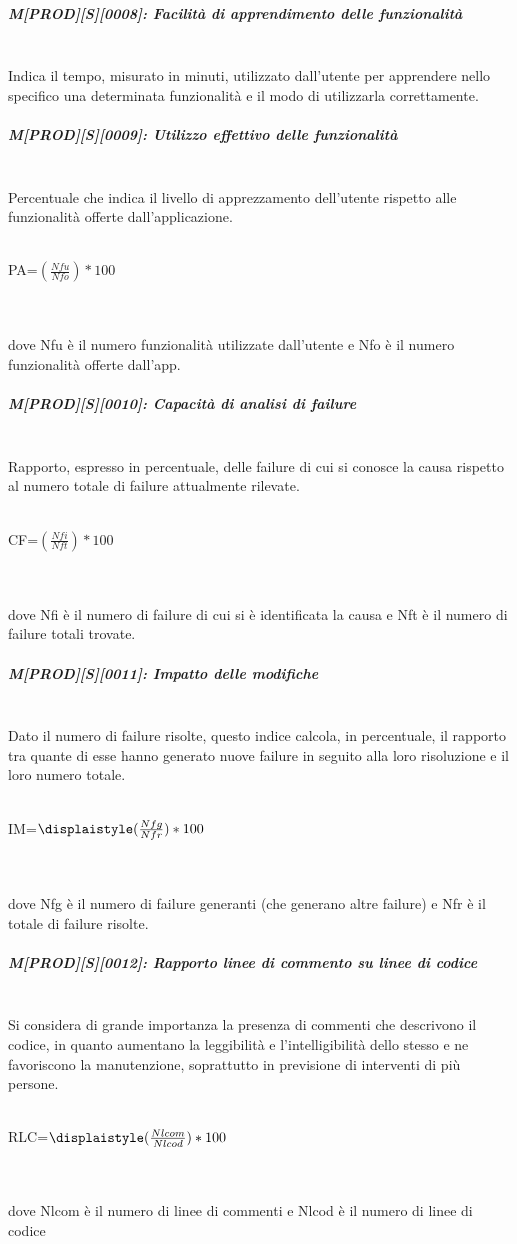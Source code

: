 \subparagraph{M[PROD][S][0008]: Facilità di apprendimento delle funzionalità}
~\\Indica il tempo, misurato in minuti, utilizzato dall'utente per apprendere nello specifico una determinata funzionalità e il modo di utilizzarla correttamente.

\subparagraph{M[PROD][S][0009]: Utilizzo effettivo delle funzionalità}
~\\Percentuale che indica il livello di apprezzamento dell'utente rispetto alle funzionalità offerte dall'applicazione.
     \\\\
    \centerline{PA=${\displaystyle({\frac{Nfu}{Nfo}})*100}$}
    \\\\
dove Nfu è il numero funzionalità utilizzate dall'utente e Nfo è il numero funzionalità offerte dall'app.

\subparagraph{M[PROD][S][0010]: Capacità di analisi di failure}
~\\Rapporto, espresso in percentuale, delle failure di cui si conosce la causa rispetto al numero totale di failure attualmente rilevate.
    \\\\
    \centerline{CF=${\displaystyle({\frac{Nfi}{Nft}})*100}$}
    \\\\
dove Nfi è il numero di failure di cui si è identificata la causa e Nft è il numero di failure totali trovate.

\subparagraph{M[PROD][S][0011]: Impatto delle modifiche}
~\\
Dato il numero di failure risolte, questo indice calcola, in percentuale, il rapporto tra quante di esse hanno generato nuove failure in seguito alla loro risoluzione e il loro numero totale.
    \\\\
    \centerline{IM=${\displaistyle({\frac{Nfg}{Nfr}})*100}$}
    \\\\
dove Nfg è il numero di failure generanti (che generano altre failure) e Nfr è il totale di failure risolte.

\subparagraph{M[PROD][S][0012]: Rapporto linee di commento su linee di codice}
~\\Si considera di grande importanza la presenza di commenti che descrivono il codice, in quanto aumentano la leggibilità e l'intelligibilità dello stesso e ne favoriscono la manutenzione, soprattutto in previsione di interventi di più persone.
    \\\\
    \centerline{RLC=${\displaistyle({\frac{Nlcom}{Nlcod}})*100}$}
    \\\\
  dove Nlcom è il numero di linee di commenti e Nlcod è il numero di linee di codice

